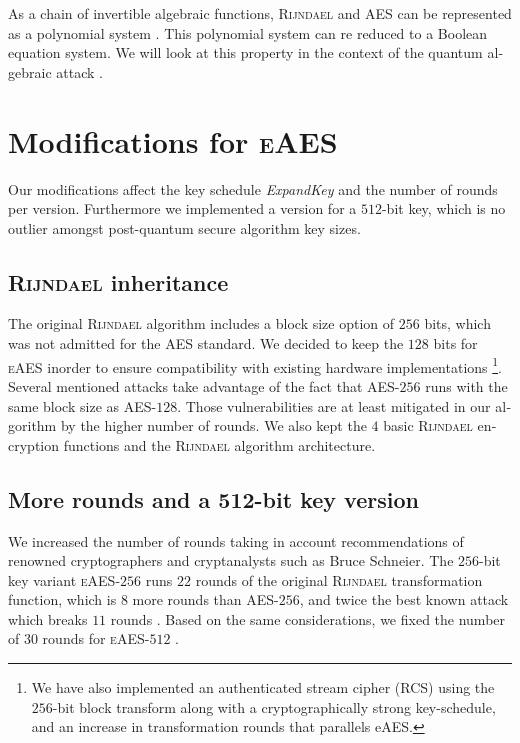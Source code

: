 \documentclass[a4paper,11pt]{article}
\begin{document}
\begin{otherlanguage}{english}
\begin{itemize} 
\end{itemize} 

\vspace{0.2cm}
\noindent
As a chain of invertible algebraic functions, \textsc{Rijndael} and \textsc{AES} can be represented as a polynomial system \cite{CCI}. This polynomial system can re reduced to a Boolean equation system. We will look at this property in the context of the quantum algebraic attack \cite{QAA}. \\

\section{Modifications for \textsc{eAES}}
\noindent
Our modifications affect the key schedule \textit{ExpandKey} and the number of rounds per version. Furthermore we implemented a version for a $512$-bit key, which is no outlier amongst post-quantum secure algorithm key sizes. \\

\subsection{\textsc{Rijndael} inheritance}
\noindent
The original \textsc{Rijndael} algorithm includes a block size option of $256$ bits, which was not admitted for the \textsc{AES} standard. We decided to keep the $128$ bits for \textsc{eAES} inorder to ensure compatibility with existing hardware implementations \footnote{We have also implemented an authenticated stream cipher (\textsc{RCS}) using the $256$-bit block transform along with a cryptographically strong key-schedule, and an increase in transformation rounds that parallels eAES.}. Several mentioned attacks take advantage of the fact that \textsc{AES}-$256$ runs with the same block size as \textsc{AES}-$128$. Those vulnerabilities are at least mitigated in our algorithm by the higher number of rounds. We also kept the $4$ basic \textsc{Rijndael} encryption functions and the \textsc{Rijndael} algorithm architecture.

\subsection{More rounds and a 512-bit key version}
\noindent
We increased the number of rounds taking in account recommendations of renowned cryptographers and cryptanalysts such as Bruce Schneier. The $256$-bit key variant \textsc{eAES}-$256$ runs $22$ rounds of the original \textsc{Rijndael} transformation function, which is $8$ more rounds than \textsc{AES}-$256$, and twice the best known attack which breaks $11$ rounds \cite{WEI}. Based on the same consi\-derations, we fixed the number of $30$ rounds for \textsc{eAES}-$512$ . 


\end{otherlanguage}
\end{document}
